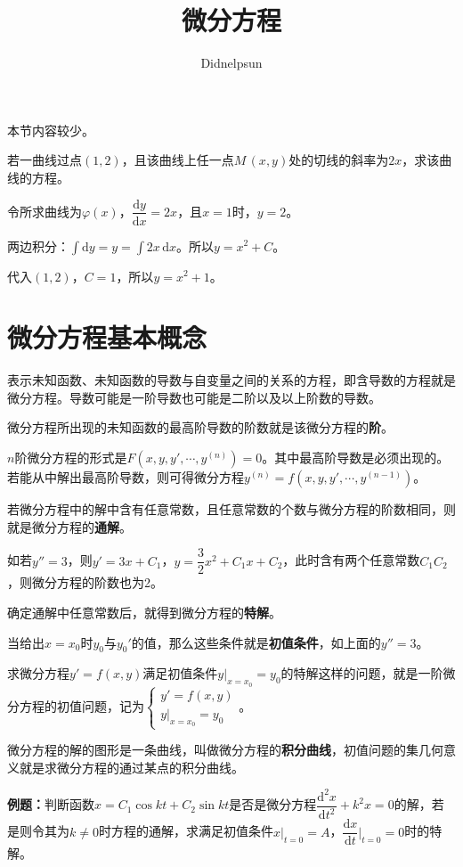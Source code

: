 \documentclass[UTF8, 12pt]{ctexart}
\author{Didnelpsun}
\title{微分方程}
\date{}
\begin{document}
\maketitle
\pagestyle{empty}
\thispagestyle{empty}
\tableofcontents
\thispagestyle{empty}
\newpage
\pagestyle{plain}
\setcounter{page}{1}

本节内容较少。

若一曲线过点$(1,2)$，且该曲线上任一点$M\,(x,y)$处的切线的斜率为$2x$，求该曲线的方程。

令所求曲线为$\varphi(x)$，$\dfrac{\textrm{d}y}{\textrm{d}x}=2x$，且$x=1$时，$y=2$。

两边积分：$\int\textrm{d}y=y=\int2x\,\textrm{d}x$。所以$y=x^2+C$。

代入$(1,2)$，$C=1$，所以$y=x^2+1$。

\section{微分方程基本概念}

表示未知函数、未知函数的导数与自变量之间的关系的方程，即含导数的方程就是微分方程。导数可能是一阶导数也可能是二阶以及以上阶数的导数。

微分方程所出现的未知函数的最高阶导数的阶数就是该微分方程的\textbf{阶}。

$n$阶微分方程的形式是$F(x,y,y',\cdots,y^{(n)})=0$。其中最高阶导数是必须出现的。若能从中解出最高阶导数，则可得微分方程$y^{(n)}=f(x,y,y',\cdots,y^{(n-1)})$。

若微分方程中的解中含有任意常数，且任意常数的个数与微分方程的阶数相同，则就是微分方程的\textbf{通解}。

如若$y''=3$，则$y'=3x+C_1$，$y=\dfrac{3}{2}x^2+C_1x+C_2$，此时含有两个任意常数$C_1C_2$，则微分方程的阶数也为2。

确定通解中任意常数后，就得到微分方程的\textbf{特解}。

当给出$x=x_0$时$y_0$与$y_0'$的值，那么这些条件就是\textbf{初值条件}，如上面的$y''=3$。

求微分方程$y'=f(x,y)$满足初值条件$y\vert_{x=x_0}=y_0$的特解这样的问题，就是一阶微分方程的初值问题，记为$\left\{\begin{array}{l}
    y'=f(x,y) \\
    y\vert_{x=x_0}=y_0
\end{array}
\right.$。

微分方程的解的图形是一条曲线，叫做微分方程的\textbf{积分曲线}，初值问题的集几何意义就是求微分方程的通过某点的积分曲线。

\textbf{例题：}判断函数$x=C_1\cos kt+C_2\sin kt$是否是微分方程$\dfrac{\textrm{d}^2x}{\textrm{d}t^2}+k^2x=0$的解，若是则令其为$k\neq0$时方程的通解，求满足初值条件$x\vert_{t=0}=A$，$\dfrac{\textrm{d}x}{\textrm{d}t}\bigg\vert_{t=0}=0$时的特解。
\end{document}

